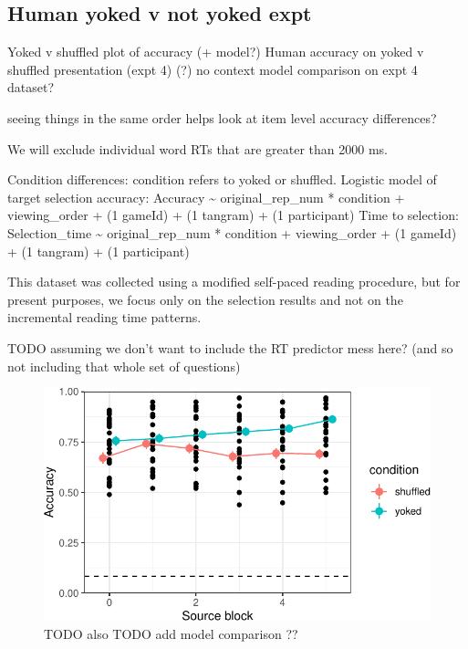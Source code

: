 \documentclass[10pt, letterpaper]{article}
\begin{document}
\subsection{Human yoked v not yoked
expt}\label{human-yoked-v-not-yoked-expt}

Yoked v shuffled plot of accuracy (+ model?) Human accuracy on yoked v
shuffled presentation (expt 4) (?) no context model comparison on expt 4
dataset?

seeing things in the same order helps look at item level accuracy
differences?

We will exclude individual word RTs that are greater than 2000 ms.

Condition differences: condition refers to yoked or shuffled. Logistic
model of target selection accuracy: Accuracy \textasciitilde{}
original\_rep\_num * condition + viewing\_order + (1 \textbar{} gameId)
+ (1 \textbar{} tangram) + (1 \textbar{} participant) Time to selection:
Selection\_time \textasciitilde{} original\_rep\_num * condition +
viewing\_order + (1 \textbar{} gameId) + (1 \textbar{} tangram) + (1
\textbar{} participant)

This dataset was collected using a modified self-paced reading
procedure, but for present purposes, we focus only on the selection
results and not on the incremental reading time patterns.

TODO assuming we don't want to include the RT predictor mess here? (and
so not including that whole set of questions)

\begin{CodeChunk}
\begin{figure}[t]

{\centering \includegraphics[width=1\linewidth]{figs/fig-n-1} 

}

\caption[TODO also TODO add model comparison ?? \label{yoked}]{TODO also TODO add model comparison ?? \label{yoked}}\label{fig:fig-n}
\end{figure}
\end{CodeChunk}
\end{document}
